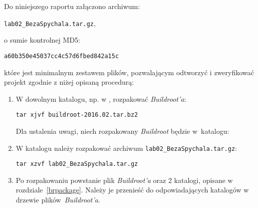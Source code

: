 \documentclass{article}
\newcommand{\labnumber}{2}
\begin{document}
Do niniejszego raportu załączono archiwum:
\begin{center}
\texttt{lab0\labnumber\_BezaSpychala.tar.gz},
\end{center}
o sumie kontrolnej MD5:
\begin{center}
\texttt{a60b350e45037cc4c57d6fbed842a15c}
\end{center}
które jest minimalnym zestawem plików, pozwalającym odtworzyć i zweryfikować projekt zgodnie z niżej opisaną procedurą:
\begin{enumerate}
\item W dowolnym katalogu, np. w , rozpakować \emph{Buildroot'a}:
\begin{center}
\texttt{tar xjvf buildroot-2016.02.tar.bz2}
\end{center}

Dla ustalenia uwagi, niech rozpakowany \emph{Buildroot} będzie w~katalogu:
\begin{center}
\end{center}

\item W katalogu  należy rozpakować archiwum \texttt{lab0\labnumber\_BezaSpychala.tar.gz}:
\begin{center}
\texttt{tar xzvf lab0\labnumber\_BezaSpychala.tar.gz}
\end{center}

\item Po rozpakowaniu powstanie plik  \emph{Buildroot'a} oraz 2 katalogi, opisane w rozdziale~\ref{brpackage}. Należy je przenieść do odpowiadających katalogów w drzewie plików~\emph{Buildroot'a}.
\end{enumerate}




\end{document}
